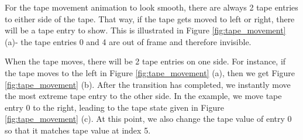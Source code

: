For the tape movement animation to look smooth, there are always 2 tape entries to either side of the tape. That way, if the tape gets moved to left or right, there will be a tape entry to show. This is illustrated in Figure \ref{fig:tape_movement} (a)- the tape entries 0 and 4 are out of frame and therefore invisible. 

When the tape moves, there will be 2 tape entries on one side. For instance, if the tape moves to the left in Figure \ref{fig:tape_movement} (a), then we get Figure \ref{fig:tape_movement} (b). After the transition has completed, we instantly move the most extreme tape entry to the other side. In the example, we move tape entry 0 to the right, leading to the tape state given in Figure \ref{fig:tape_movement} (c). At this point, we also change the tape value of entry 0 so that it matches tape value at index 5.
